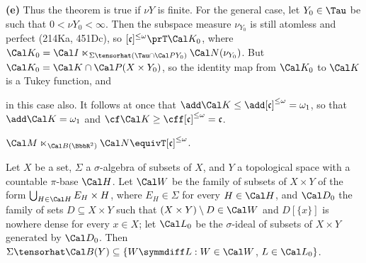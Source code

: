 {\medskip

{\bf (e)} Thus the theorem is true if $\nu Y$ is finite.   For the
general case, let $Y_0\in\Tau$ be such that $0<\nu Y_0<\infty$.
Then the subspace measure $\nu_{Y_0}$ is still atomless and perfect
(214Ka, 451Dc), so $[\frak c]^{\le\omega}\prT\Cal K_0$, where
$\Cal K_0=\Cal I\ltimes_{\Sigma\tensorhat(\Tau\cap\Cal PY_0)}
\Cal N(\nu_{Y_0})$.
But $\Cal K_0=\Cal K\cap\Cal P(X\times Y_0)$,
so the identity map from $\Cal K_0$ to
$\Cal K$ is a Tukey function, and


\noindent in this case also.
It follows at once that $\add\Cal K\le\add[\frak c]^{\le\omega}=\omega_1$,
so that $\add\Cal K=\omega_1$ and
$\cf\Cal K\ge\cff[\frak c]^{\le\omega}=\frak c$.
}%

 $\Cal M\ltimes_{\Cal B(\BbbR^2)}\Cal N
\equivT[\frak c]^{\le\omega}$.


 Let $X$ be a set, $\Sigma$ a $\sigma$-algebra of
subsets of $X$, and $Y$ a topological space with a countable $\pi$-base
$\Cal H$.   Let $\Cal W$ be the family of subsets of $X\times Y$ of the
form $\bigcup_{H\in\Cal H}E_H\times H$, where $E_H\in\Sigma$ for every
$H\in\Cal H$, and
$\Cal D_0$ the family of sets $D\subseteq X\times Y$ such that
$(X\times Y)\setminus D\in\Cal W$ and $D[\{x\}]$ is nowhere dense for
every $x\in X$;  let $\Cal L_0$ be the $\sigma$-ideal of subsets of
$X\times Y$ generated by $\Cal D_0$.   Then
$\Sigma\tensorhat\Cal B(Y)
\subseteq\{W\symmdiff L:W\in\Cal W$, $L\in\Cal L_0\}$.

